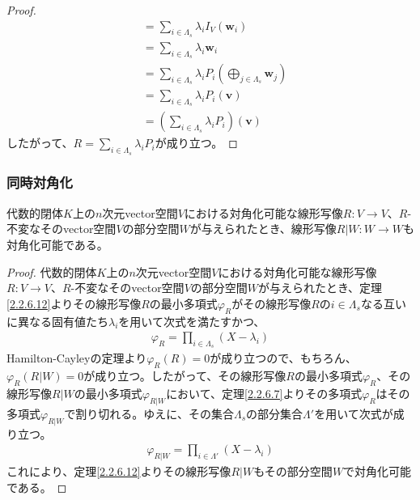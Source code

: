 \documentclass[dvipdfmx]{jsarticle}
\begin{document}
\begin{proof}
\begin{align*}
&= \sum_{i \in \varLambda_{s}} {\lambda_{i}I_{V}\left( \mathbf{w}_{i} \right)} \\
&= \sum_{i \in \varLambda_{s}} {\lambda_{i}\mathbf{w}_{i}} \\
&= \sum_{i \in \varLambda_{s}} {\lambda_{i}P_{i}\left( \bigoplus_{j \in \varLambda_{s}} \mathbf{w}_{j} \right)} \\
&= \sum_{i \in \varLambda_{s}} {\lambda_{i}P_{i}\left( \mathbf{v} \right)} \\
&= \left( \sum_{i \in \varLambda_{s}} {\lambda_{i}P_{i}} \right)\left( \mathbf{v} \right)
\end{align*}
したがって、$R = \sum_{i \in \varLambda_{s}} {\lambda_{i}P_{i}}$が成り立つ。
\end{proof}
\subsubsection{同時対角化}%
\begin{thm}\label{2.2.7.2}
代数的閉体$K$上の$n$次元vector空間$V$における対角化可能な線形写像$R:V \rightarrow V$、$R$-不変なそのvector空間$V$の部分空間$W$が与えられたとき、線形写像$R|W:W \rightarrow W$も対角化可能である。
\end{thm}
\begin{proof}
代数的閉体$K$上の$n$次元vector空間$V$における対角化可能な線形写像$R:V \rightarrow V$、$R$-不変なそのvector空間$V$の部分空間$W$が与えられたとき、定理\ref{2.2.6.12}よりその線形写像$R$の最小多項式$\varphi_{R}$がその線形写像$R$の$i \in \varLambda_{s}$なる互いに異なる固有値たち$\lambda_{i}$を用いて次式を満たすかつ、
\begin{align*}
\varphi_{R} = \prod_{i \in \varLambda_{s}} \left( X - \lambda_{i} \right)
\end{align*}
Hamilton-Cayleyの定理より$\varphi_{R}(R) = 0$が成り立つので、もちろん、$\varphi_{R}\left( R|W \right) = 0$が成り立つ。したがって、その線形写像$R$の最小多項式$\varphi_{R}$、その線形写像$R|W$の最小多項式$\varphi_{R|W}$において、定理\ref{2.2.6.7}よりその多項式$\varphi_{R}$はその多項式$\varphi_{R|W}$で割り切れる。ゆえに、その集合$\varLambda_{s}$の部分集合$\varLambda'$を用いて次式が成り立つ。
\begin{align*}
\varphi_{R|W} = \prod_{i \in \varLambda'} \left( X - \lambda_{i} \right)
\end{align*}
これにより、定理\ref{2.2.6.12}よりその線形写像$R|W$もその部分空間$W$で対角化可能である。
\end{proof}
\end{document}
